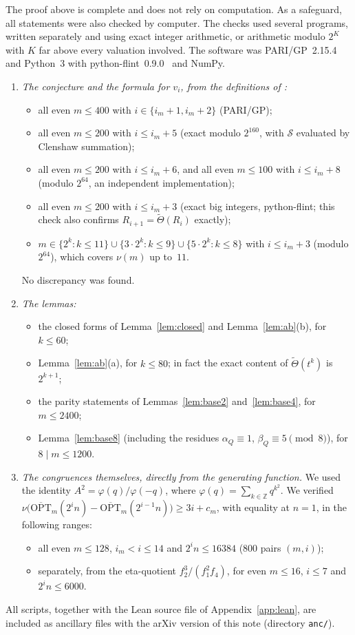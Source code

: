 \documentclass[11pt]{amsart}
\theoremstyle{definition}
\theoremstyle{remark}
\newcommand{\Z}{\mathbb{Z}}
\newcommand{\OPT}{\overline{\mathrm{OPT}}}
\newcommand{\Sop}{\mathcal{S}}
\newcommand{\Th}{\widetilde{\Theta}}
\begin{document}
The proof above is complete and does not rely on computation. As a safeguard, all statements were also checked by computer. The checks used several programs, written separately and using exact integer arithmetic, or arithmetic modulo $2^K$ with $K$ far above every valuation involved. The software was PARI/GP~2.15.4~\cite{PARI} and Python~3 with python-flint~0.9.0~\cite{FLINT} and NumPy.
\begin{enumerate}[1.]
\item \emph{The conjecture and the formula for $v_i$, from the definitions of \cite[\S6]{ST}:}
\begin{itemize}
\item all even $m\le400$ with $i\in\{i_m+1,i_m+2\}$ (PARI/GP);
\item all even $m\le200$ with $i\le i_m+5$ (exact modulo $2^{160}$, with $\Sop$ evaluated by Clenshaw summation);
\item all even $m\le200$ with $i\le i_m+6$, and all even $m\le100$ with $i\le i_m+8$ (modulo $2^{64}$, an independent implementation);
\item all even $m\le200$ with $i\le i_m+3$ (exact big integers, python-flint; this check also confirms $R_{i+1}=\Th(R_i)$ exactly);
\item $m\in\{2^k:k\le11\}\cup\{3\cdot2^k:k\le9\}\cup\{5\cdot2^k:k\le8\}$ with $i\le i_m+3$ (modulo $2^{64}$), which covers $\nu(m)$ up to~$11$.
\end{itemize}
No discrepancy was found.
\item \emph{The lemmas:}
\begin{itemize}
\item the closed forms of Lemma~\ref{lem:closed} and Lemma~\ref{lem:ab}(b), for $k\le60$;
\item Lemma~\ref{lem:ab}(a), for $k\le80$; in fact the exact content of $\Th(t^k)$ is $2^{k+1}$;
\item the parity statements of Lemmas~\ref{lem:base2} and~\ref{lem:base4}, for $m\le2400$;
\item Lemma~\ref{lem:base8} (including the residues $\alpha_Q\equiv1$, $\beta_Q\equiv5\pmod 8$), for $8\mid m\le1200$.
\end{itemize}
\item \emph{The congruences themselves, directly from the generating function.} We used the identity $A^2=\varphi(q)/\varphi(-q)$, where $\varphi(q)=\sum_{k\in\Z}q^{k^2}$. We verified $\nu\big(\OPT_m(2^in)-\OPT_m(2^{i-1}n)\big)\ge3i+c_m$, with equality at $n=1$, in the following ranges:
\begin{itemize}
\item all even $m\le128$, $i_m<i\le14$ and $2^in\le 16384$ (800 pairs $(m,i)$);
\item separately, from the eta-quotient $f_2^3/(f_1^2f_4)$, for even $m\le16$, $i\le7$ and $2^in\le6000$.
\end{itemize}
\end{enumerate}
All scripts, together with the Lean source file of Appendix~\ref{app:lean}, are included as ancillary files with the arXiv version of this note (directory \texttt{anc/}).
\end{document}
